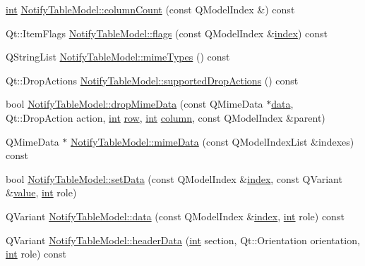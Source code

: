 \begin{DoxyCompactItemize}
\item 
\hyperlink{ioapi_8h_a787fa3cf048117ba7123753c1e74fcd6}{int} \hyperlink{group__notifyplugin_gaf90f7b29e6b11f9e569df9adf0c0f01f}{Notify\-Table\-Model\-::column\-Count} (const Q\-Model\-Index \&) const 
\item 
Qt\-::\-Item\-Flags \hyperlink{group__notifyplugin_ga19b5a3d99feb4907b2332962b1468b9f}{Notify\-Table\-Model\-::flags} (const Q\-Model\-Index \&\hyperlink{glext_8h_ab47dd9958bcadea08866b42bf358e95e}{index}) const 
\item 
Q\-String\-List \hyperlink{group__notifyplugin_ga8f52bed133220f83210db9d483d6aa26}{Notify\-Table\-Model\-::mime\-Types} () const 
\item 
Qt\-::\-Drop\-Actions \hyperlink{group__notifyplugin_gac83d6e04277e98b87cb42b0ab9b3c9be}{Notify\-Table\-Model\-::supported\-Drop\-Actions} () const 
\item 
bool \hyperlink{group__notifyplugin_ga623fe8a3346c4c0565352170fc44c4a9}{Notify\-Table\-Model\-::drop\-Mime\-Data} (const Q\-Mime\-Data $\ast$\hyperlink{glext_8h_a8850df0785e6fbcc2351af3b686b8c7a}{data}, Qt\-::\-Drop\-Action action, \hyperlink{ioapi_8h_a787fa3cf048117ba7123753c1e74fcd6}{int} \hyperlink{glext_8h_a11b277b422822f784ee248b43eee3e1e}{row}, \hyperlink{ioapi_8h_a787fa3cf048117ba7123753c1e74fcd6}{int} \hyperlink{glext_8h_a3b58c39b1b7ca6f4012b27e84de3bdb3}{column}, const Q\-Model\-Index \&parent)
\item 
Q\-Mime\-Data $\ast$ \hyperlink{group__notifyplugin_gad898510a85b3055557ed33dc8e319b51}{Notify\-Table\-Model\-::mime\-Data} (const Q\-Model\-Index\-List \&indexes) const 
\item 
bool \hyperlink{group__notifyplugin_gafd2c78e02d0c8123cc83714a3a5ce595}{Notify\-Table\-Model\-::set\-Data} (const Q\-Model\-Index \&\hyperlink{glext_8h_ab47dd9958bcadea08866b42bf358e95e}{index}, const Q\-Variant \&\hyperlink{glext_8h_aa0e2e9cea7f208d28acda0480144beb0}{value}, \hyperlink{ioapi_8h_a787fa3cf048117ba7123753c1e74fcd6}{int} role)
\item 
Q\-Variant \hyperlink{group__notifyplugin_gacf622323e5cab0f1ecdeb6d35e4b8039}{Notify\-Table\-Model\-::data} (const Q\-Model\-Index \&\hyperlink{glext_8h_ab47dd9958bcadea08866b42bf358e95e}{index}, \hyperlink{ioapi_8h_a787fa3cf048117ba7123753c1e74fcd6}{int} role) const 
\item 
Q\-Variant \hyperlink{group__notifyplugin_gab211bb28323ebcede08ef838bc6b2789}{Notify\-Table\-Model\-::header\-Data} (\hyperlink{ioapi_8h_a787fa3cf048117ba7123753c1e74fcd6}{int} section, Qt\-::\-Orientation orientation, \hyperlink{ioapi_8h_a787fa3cf048117ba7123753c1e74fcd6}{int} role) const 

\end{DoxyCompactItemize}
